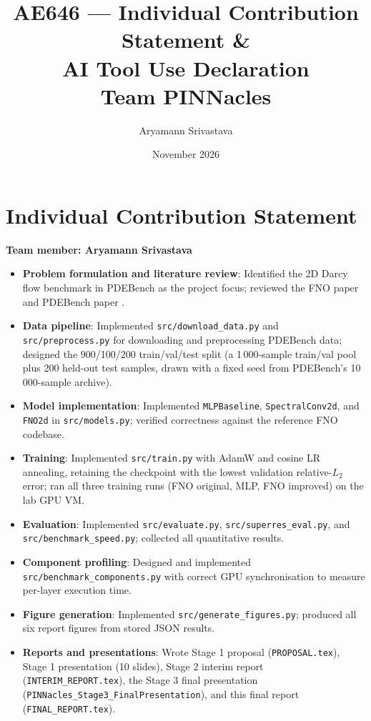 \documentclass[11pt,a4paper]{article}
\title{\textbf{AE646 --- Individual Contribution Statement \&\\AI Tool Use Declaration}\\[0.5em]
\large Team PINNacles}
\author{Aryamann Srivastava}
\date{November 2026}
\begin{document}
\maketitle

\section*{Individual Contribution Statement}

\textbf{Team member: Aryamann Srivastava}

\begin{itemize}
  \item \textbf{Problem formulation and literature review}: Identified the 2D Darcy flow benchmark in PDEBench as the project focus; reviewed the FNO paper \cite{li2021fno} and PDEBench paper \cite{takamoto2022pdebench}.

  \item \textbf{Data pipeline}: Implemented \texttt{src/download\_data.py} and \texttt{src/preprocess.py} for downloading and preprocessing PDEBench data; designed the 900/100/200 train/val/test split (a 1\,000-sample train/val pool plus 200 held-out test samples, drawn with a fixed seed from PDEBench's 10\,000-sample archive).

  \item \textbf{Model implementation}: Implemented \texttt{MLPBaseline}, \texttt{SpectralConv2d}, and \texttt{FNO2d} in \texttt{src/models.py}; verified correctness against the reference FNO codebase.

  \item \textbf{Training}: Implemented \texttt{src/train.py} with AdamW and cosine LR annealing, retaining the checkpoint with the lowest validation relative-$L_2$ error; ran all three training runs (FNO original, MLP, FNO improved) on the lab GPU VM.

  \item \textbf{Evaluation}: Implemented \texttt{src/evaluate.py}, \texttt{src/superres\_eval.py}, and \texttt{src/benchmark\_speed.py}; collected all quantitative results.

  \item \textbf{Component profiling}: Designed and implemented \texttt{src/benchmark\_components.py} with correct GPU synchronisation to measure per-layer execution time.

  \item \textbf{Figure generation}: Implemented \texttt{src/generate\_figures.py}; produced all six report figures from stored JSON results.

  \item \textbf{Reports and presentations}: Wrote Stage 1 proposal (\texttt{PROPOSAL.tex}), Stage 1 presentation (10 slides), Stage 2 interim report (\texttt{INTERIM\_REPORT.tex}), the Stage 3 final presentation (\texttt{PINNacles\_Stage3\_FinalPresentation}), and this final report (\texttt{FINAL\_REPORT.tex}).
\end{itemize}
\end{document}
